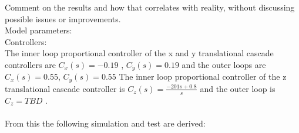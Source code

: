 Comment on the results and how that correlates with reality, without discussing possible issues or improvements.\\
Model parameters: \\
Controllers:\\
The inner loop proportional controller of the x and y translational cascade controllers are $C_{\dot{x}}(s)= -0.19$
, $C_{\dot{y}}(s)= 0.19$ and the outer loops are $C_x(s)= 0.55$, $C_y(s)= 0.55$
The inner loop proportional controller of the z translational cascade controller is
$C_{\dot{z}}(s)=\frac{-201s+0.8}{s}$ and the outer loop is $C_z=TBD$ .\\ \\
From this the following simulation and test are derived: 